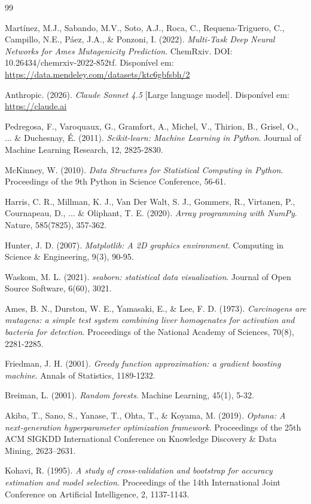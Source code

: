 \documentclass[12pt,a4paper]{article}
\begin{document}
\begin{thebibliography}{99}

Martínez, M.J., Sabando, M.V., Soto, A.J., Roca, C., Requena-Triguero, C., Campillo, N.E., Páez, J.A., \& Ponzoni, I. (2022). 
\textit{Multi-Task Deep Neural Networks for Ames Mutagenicity Prediction}. 
ChemRxiv. DOI: 10.26434/chemrxiv-2022-852tf. 
Disponível em: \url{https://data.mendeley.com/datasets/ktc6gbfsbh/2}

Anthropic. (2026). 
\textit{Claude Sonnet 4.5} [Large language model]. 
Disponível em: \url{https://claude.ai}

Pedregosa, F., Varoquaux, G., Gramfort, A., Michel, V., Thirion, B., Grisel, O., ... \& Duchesnay, É. (2011). 
\textit{Scikit-learn: Machine Learning in Python}. 
Journal of Machine Learning Research, 12, 2825-2830.

McKinney, W. (2010). 
\textit{Data Structures for Statistical Computing in Python}. 
Proceedings of the 9th Python in Science Conference, 56-61.

Harris, C. R., Millman, K. J., Van Der Walt, S. J., Gommers, R., Virtanen, P., Cournapeau, D., ... \& Oliphant, T. E. (2020). 
\textit{Array programming with NumPy}. 
Nature, 585(7825), 357-362.

Hunter, J. D. (2007). 
\textit{Matplotlib: A 2D graphics environment}. 
Computing in Science \& Engineering, 9(3), 90-95.

Waskom, M. L. (2021). 
\textit{seaborn: statistical data visualization}. 
Journal of Open Source Software, 6(60), 3021.

Ames, B. N., Durston, W. E., Yamasaki, E., \& Lee, F. D. (1973). 
\textit{Carcinogens are mutagens: a simple test system combining liver homogenates for activation and bacteria for detection}. 
Proceedings of the National Academy of Sciences, 70(8), 2281-2285.

Friedman, J. H. (2001). 
\textit{Greedy function approximation: a gradient boosting machine}. 
Annals of Statistics, 1189-1232.

Breiman, L. (2001). 
\textit{Random forests}. 
Machine Learning, 45(1), 5-32.

Akiba, T., Sano, S., Yanase, T., Ohta, T., \& Koyama, M. (2019).
\textit{Optuna: A next-generation hyperparameter optimization framework}.
Proceedings of the 25th ACM SIGKDD International Conference on Knowledge Discovery \& Data Mining, 2623--2631.

Kohavi, R. (1995). 
\textit{A study of cross-validation and bootstrap for accuracy estimation and model selection}. 
Proceedings of the 14th International Joint Conference on Artificial Intelligence, 2, 1137-1143.

\end{thebibliography}
\end{document}

